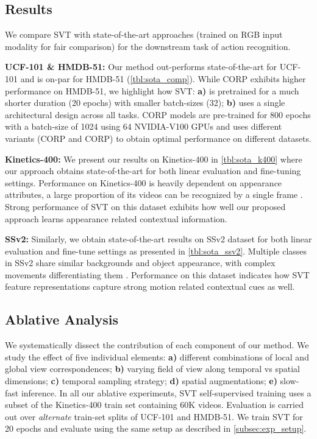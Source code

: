 \documentclass[10pt,twocolumn,letterpaper]{article}
\begin{document}
\subsection{Results}
We compare SVT with state-of-the-art approaches (trained on RGB input modality for fair comparison) for the downstream task of action recognition.

\vspace{0.1em}
\noindent\textbf{UCF-101 \& HMDB-51:} Our method out-performs state-of-the-art for UCF-101 and is on-par for HMDB-51 (\cref{tbl:sota_comp}). 
While CORP \cite{Hu_2021_ICCV} exhibits higher performance on HMDB-51, we highlight how SVT: \textbf{a)} is pretrained for a much shorter duration (20 epochs) with smaller batch-sizes (32); \textbf{b)} uses a single architectural design across all tasks. CORP \cite{Hu_2021_ICCV} models are pre-trained for 800 epochs with a batch-size of 1024 using 64 NVIDIA-V100 GPUs and uses different variants (CORP and CORP) to obtain optimal performance on different datasets.

\vspace{0.1em}
\noindent\textbf{Kinetics-400:} 
We present our results on Kinetics-400 \cite{kinetics400} in \cref{tbl:sota_k400} where our approach obtains state-of-the-art for both linear evaluation and fine-tuning settings. Performance on Kinetics-400 is heavily dependent on appearance attributes, \ie a large proportion of its videos can
be recognized by a single frame  \cite{zhu_arxiv2020_comprehensiveVideo}. 
Strong performance of SVT on this dataset exhibits how well our proposed approach learns appearance related contextual information.

\vspace{0.1em}
\noindent\textbf{SSv2:} Similarly, we obtain state-of-the-art results on SSv2 dataset \cite{goyal2017something} for both linear evaluation and fine-tune settings as presented in \cref{tbl:sota_ssv2}.  Multiple classes in SSv2 share similar backgrounds and object appearance, with complex movements differentiating them \cite{Hu_2021_ICCV}. Performance on this dataset indicates how 
SVT feature representations capture strong motion related contextual cues as well.


\subsection{Ablative Analysis}
We systematically dissect the contribution of each component of our method. 
We study the effect of five individual elements: 
\textbf{a)} different combinations of local and global view correspondences;
\textbf{b)} varying field of view along temporal vs spatial dimensions;
\textbf{c)} temporal sampling strategy;
\textbf{d)} spatial augmentations;
\textbf{e)} slow-fast inference.
In all our ablative experiments, SVT self-supervised training uses a subset of the Kinetics-400 train set containing 60K videos. Evaluation is carried out over \emph{alternate} train-set splits of UCF-101 and HMDB-51. We train SVT for 20 epochs and evaluate using the same setup as described in \cref{subsec:exp_setup}.
\end{document}
